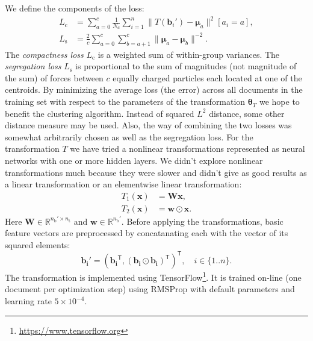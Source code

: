 \documentclass[10pt, a4paper]{article}
\newcommand{\vect}[1]{\bm{#1}}
\newcommand{\matr}[1]{\vect{#1}}
\newcommand{\transpose}{\mathsf T}
\begin{document}
We define the components of the loss: 
\begin{align}
	L_\mathrm{c} &= \sum_{a=0}^{c}\frac{1}{N_a} 
		\sum_{i=1}^{n} \| T(\vect{b}_i')-\vect{\mu}_{a}\|^2 [a_i=a], \\
	L_\mathrm{s} &= \frac{2}{c}\sum_{a=0}^{c}\sum_{b=a+1}^{c} \|\vect{\mu}_a-\vect{\mu}_b\|^{-2}.
\end{align}
The \emph{compactness loss} $L_\mathrm{c}$ is a weighted sum of within-group variances. The \emph{segregation loss}  $L_\mathrm{s}$ is proportional to the sum of magnitudes (not magnitude of the sum) of forces between $c$ equally charged particles each located at one of the centroids. By minimizing the average loss (the error) across all documents in the training set with respect to the parameters of the transformation $\vect{\theta}_T$ we hope to benefit the clustering algorithm. Instead of squared $L^2$ distance, some other distance measure may be used. Also, the way of combining the two losses was somewhat arbitrarily chosen as well as the segregation loss. For the transformation $T$ we have tried a nonlinear transformations represented as neural networks with one or more hidden layers. We didn't explore nonlinear transformations much because they were slower and didn't give as good results as a linear transformation or an elementwise linear transformation:
\begin{align}
	T_\mathrm{1}(\vect{x}) &= \matr{W}\vect{x}, \\
	T_\mathrm{2}(\vect{x}) &= \vect{w}\odot\vect{x}.
\end{align}
Here $\matr{W}\in \mathbb{R}^{n_\mathrm{b}'\times n_\mathrm{t}}$ and $\vect{w}\in \mathbb{R}^{n_\mathrm{b}'}$.
Before applying the transformations, basic feature vectors are preprocessed by concatanating each with the vector of its squared elements:
\begin{equation}
	\vect{b_i'} = (\vect{b_i}^\transpose, (\vect{b_i}\odot\vect{b_i})^\transpose)^\transpose, \quad i\in \{1..n\}.
\end{equation}
The transformation is implemented using TensorFlow\footnote{\url{https://www.tensorflow.org}}. It is trained on-line (one document per optimization step) using RMSProp \citep{tielman-2012} with default parameters and learning rate $5\times 10^{-4}$. 
\end{document}
